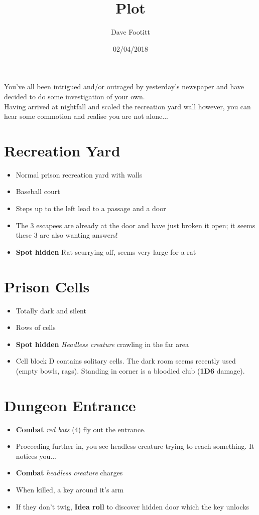 \documentclass[12pt,a4paper]{article}
\author{Dave Footitt}
\title{Plot}
\date{02/04/2018}
\begin{document}
You've all been intrigued and/or outraged by yesterday's newspaper and have decided to do some investigation of your own.\\
Having arrived at nightfall and scaled the recreation yard wall however, you can hear some commotion and realise you are not alone...
\section*{Recreation Yard}
\begin{itemize}
\item{Normal prison recreation yard with walls}
\item{Baseball court}
\item{Steps up to the left lead to a passage and a door}
\item{The 3 escapees are already at the door and have just broken it open; it seems these 3 are also wanting answers!}
\item{\textbf{Spot hidden} Rat scurrying off, seems very large for a rat}
\end{itemize}
\section*{Prison Cells}
\begin{itemize}
\item{Totally dark and silent}
\item{Rows of cells}
\item{\textbf{Spot hidden} \textit{Headless creature} crawling in the far area}
\item{Cell block D contains solitary cells.  The dark room seems recently used (empty bowls, rags).  Standing in corner is a bloodied club (\textbf{1D6} damage).}
\end{itemize}
\section*{Dungeon Entrance}
\begin{itemize}
\item{\textbf{Combat} \textit{red bats} (4) fly out the entrance.}
\item{Proceeding further in, you see headless creature trying to reach something.  It notices you...}
\item{\textbf{Combat} \textit{headless creature} charges}
\item{When killed, a key around it's arm}
\item{If they don't twig, \textbf{Idea roll} to discover hidden door which the key unlocks}
\end{itemize}
\newpage
\end{document}
